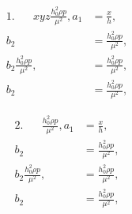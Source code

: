 		
		\vspace{10 mm}
		
		\begin{minipage}[t]{0.5\textwidth}
			\begin{align*}
			1.\hspace{20pt}xyz\frac{h_0^2 \rho p}{\mu^2},a_1 &= \frac{x}{h},\\ 
			b_2 &= \frac{h_0^2 \rho p}{\mu^2},\\
			b_2\frac{h_0^2 \rho p}{\mu^2}, &= \frac{h_0^2 \rho p}{\mu^2},\\
			b_2 &= \frac{h_0^2 \rho p}{\mu^2},
			\end{align*}
		\end{minipage}
		\begin{minipage}[t]{0.5\textwidth}
			\begin{align*}
			2.\hspace{20pt}\frac{h_0^2 \rho p}{\mu^2},a_1 &= \frac{x}{h},\\ 
			b_2 &= \frac{h_0^2 \rho p}{\mu^2},\\
			b_2\frac{h_0^2 \rho p}{\mu^2}, &= \frac{h_0^2 \rho p}{\mu^2},\\
			b_2 &= \frac{h_0^2 \rho p}{\mu^2},
			\end{align*}
		\end{minipage}
		
		
		\vspace{10 mm}

